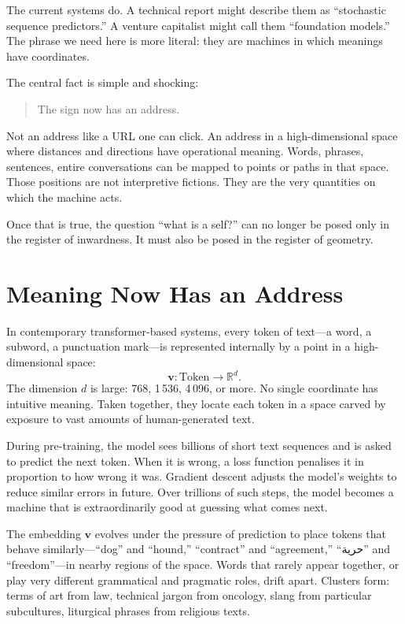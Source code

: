 \documentclass[12pt,a4paper]{report}
\begin{document}
The current systems do. A technical report might describe them as ``stochastic sequence predictors.'' A venture capitalist might call them ``foundation models.'' The phrase we need here is more literal: they are machines in which meanings have coordinates.

The central fact is simple and shocking:

\begin{quote}
The sign now has an address.
\end{quote}

Not an address like a URL one can click. An address in a high-dimensional space where distances and directions have operational meaning. Words, phrases, sentences, entire conversations can be mapped to points or paths in that space. Those positions are not interpretive fictions. They are the very quantities on which the machine acts.

Once that is true, the question ``what is a self?'' can no longer be posed only in the register of inwardness. It must also be posed in the register of geometry.

\section{Meaning Now Has an Address}

In contemporary transformer-based systems, every token of text---a word, a subword, a punctuation mark---is represented internally by a point in a high-dimensional space:
\[
\mathbf{v} : \text{Token} \rightarrow \mathbb{R}^{d}.
\]
The dimension $d$ is large: 768, 1\,536, 4\,096, or more. No single coordinate has intuitive meaning. Taken together, they locate each token in a space carved by exposure to vast amounts of human-generated text.

During pre-training, the model sees billions of short text sequences and is asked to predict the next token. When it is wrong, a loss function penalises it in proportion to how wrong it was. Gradient descent adjusts the model's weights to reduce similar errors in future. Over trillions of such steps, the model becomes a machine that is extraordinarily good at guessing what comes next.

The embedding $\mathbf{v}$ evolves under the pressure of prediction to place tokens that behave similarly---``dog'' and ``hound,'' ``contract'' and ``agreement,'' ``\textarabic{حرية}'' and ``freedom''---in nearby regions of the space. Words that rarely appear together, or play very different grammatical and pragmatic roles, drift apart. Clusters form: terms of art from law, technical jargon from oncology, slang from particular subcultures, liturgical phrases from religious texts.
\end{document}

